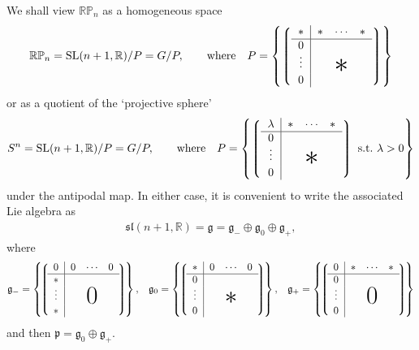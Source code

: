 We shall view ${\mathbb{RP}}_n$ as a homogeneous space
\[{\mathbb{RP}}_n={\mathrm{SL}}(n+1,{\mathbb{R}})/P=G/P,\qquad\mbox{where}\quad
P=\left\{
\left\lgroup\begin{tabular}{c|ccc}$\ast$&$\ast$&$\!\cdots\!$&$\ast$\\ \hline
$0$\\
\raisebox{2pt}[15pt]{$\vdots$}&&
\raisebox{-2pt}[0pt][0pt]{\makebox[0pt]{\Huge$\ast$}}\\
$0$\end{tabular}\right\rgroup\right\}\]
or as a quotient of the `projective sphere'
\[S^n={\mathrm{SL}}(n+1,{\mathbb{R}})/P=G/P,\qquad\mbox{where}\quad
P=\left\{
\left\lgroup\begin{tabular}{c|ccc}$\lambda$&$\ast$&$\!\cdots\!$&$\ast$\\ \hline
$0$\\
\raisebox{2pt}[15pt]{$\vdots$}&&
\raisebox{-2pt}[0pt][0pt]{\makebox[0pt]{\Huge$\ast$}}\\
$0$\end{tabular}\right\rgroup\mbox{ s.t.\ }\lambda>0\right\}\]
under the antipodal map. In either case, it is convenient to write the
associated Lie algebra as
\begin{gather}\label{graded}
{\mathfrak{sl}}(n+1,{\mathbb{R}})={\mathfrak{g}}=
{\mathfrak{g}}_-\oplus{\mathfrak{g}}_0\oplus{\mathfrak{g}}_+,
\end{gather}
where{\samepage
\begin{gather*}
{\mathfrak{g}}_-=\left\{\!
\left\lgroup\!\begin{tabular}{c|ccc}$0$&$0$&$\!\cdots\!$&$0$\\ \hline
$\ast$\\
\raisebox{2pt}[15pt]{$\vdots$}&&
\raisebox{-2pt}[0pt][0pt]{\makebox[0pt]{\Huge$0$}}\\
$\ast$\end{tabular}\!\right\rgroup\!\right\},\!\quad
{\mathfrak{g}}_0=\left\{\!
\left\lgroup\!\begin{tabular}{c|ccc}$\ast$&$0$&$\!\cdots\!$&$0$\\ \hline
$0$\\
\raisebox{2pt}[15pt]{$\vdots$}&&
\raisebox{-2pt}[0pt][0pt]{\makebox[0pt]{\Huge$\ast$}}\\
$0$\end{tabular}\!\right\rgroup\!\right\},\!\quad
{\mathfrak{g}}_+=\left\{\!
\left\lgroup\!\begin{tabular}{c|ccc}$0$&$\ast$&$\!\cdots\!$&$\ast$\\ \hline
$0$\\
\raisebox{2pt}[15pt]{$\vdots$}&&
\raisebox{-2pt}[0pt][0pt]{\makebox[0pt]{\Huge$0$}}\\
$0$\end{tabular}\!\right\rgroup\!\right\}
\end{gather*}
and then ${\mathfrak{p}}={\mathfrak{g}}_0\oplus{\mathfrak{g}}_+$.}

